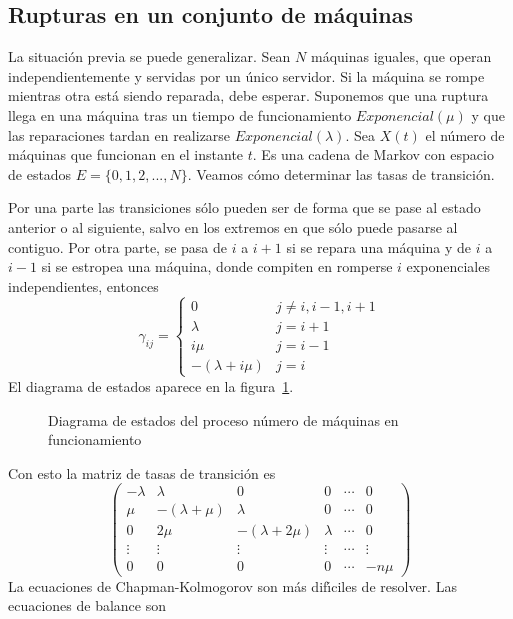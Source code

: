 \subsection{Rupturas en un conjunto de m\'{a}quinas}
La situaci\'{o}n previa se puede generalizar. Sean $N$ m\'{a}quinas
iguales, que operan independientemente y servidas por un \'{u}nico
servidor. Si la m\'{a}quina se rompe mientras otra est\'{a} siendo
reparada, debe esperar. Suponemos que una ruptura llega en una
m\'{a}quina tras un tiempo de funcionamiento $Exponencial(\mu)$ y que
las reparaciones tardan en realizarse $Exponencial(\lambda)$. Sea
$X(t)$ el n\'{u}mero de m\'{a}quinas que funcionan en el instante $t$. Es
una cadena de Markov con espacio de estados $E=\{0,1,2,...,N\}$.
Veamos c\'{o}mo determinar las tasas de transici\'{o}n.
\par
Por una parte las transiciones s\'{o}lo pueden ser de forma que se
pase al estado anterior o al siguiente, salvo en los extremos en
que s\'{o}lo puede pasarse al contiguo. Por otra parte, se pasa de
$i$ a $i+1$ si se repara una m\'{a}quina y de $i$ a $i-1$ si se
estropea una m\'{a}quina, donde compiten en romperse $i$ exponenciales
independientes, entonces
\[
\gamma_{ij}=\left \{
\begin{array}{cl}
0& j\neq i,i-1,i+1\\
\lambda&j=i+1\\
i\mu&j=i-1\\
-(\lambda+i\mu)&j=i
\end{array}\right.
\]
El diagrama de estados aparece en la figura~\ref{ruptura}.
\begin{figure}
\centerline{}
\caption[]{Diagrama de estados del proceso n\'{u}mero de m\'{a}quinas en
funcionamiento} \label{ruptura}
\end{figure}
Con esto la matriz de tasas de transici\'{o}n es
\[
\begin{pmatrix}
  -\lambda & \lambda   &     0 & 0 & \cdots &  0\\
   \mu     &-(\lambda+\mu)& \lambda &  0&\cdots  & 0 \\
      0    & 2\mu      & -(\lambda+2\mu)&\lambda  & \cdots&0  \\
 \vdots    &  \vdots   & \vdots & \vdots & \cdots & \vdots \\
   0       &  0        &0  & 0 & \cdots &-n\mu
\end{pmatrix}
\]
La ecuaciones de Chapman-Kolmogorov son m\'{a}s dif\'{\i}ciles de resolver.
Las ecuaciones de balance son
